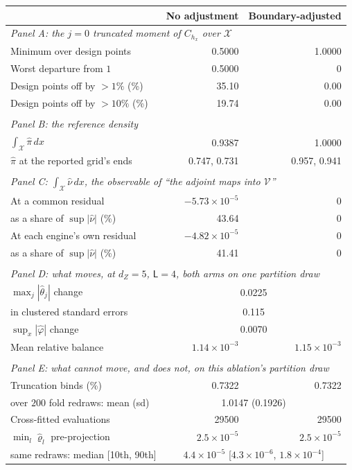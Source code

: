 \begin{tabular}{lrr}
\toprule
 & No adjustment & Boundary-adjusted \\
\midrule
\multicolumn{3}{l}{\textit{Panel A: the $j=0$ truncated moment of $C_{h_x}$ over $\mathcal X$}} \\
Minimum over design points & 0.5000 & 1.0000 \\
Worst departure from $1$ & 0.5000 & $0$ \\
Design points off by $>1\%$ (\%) & 35.10 & 0.00 \\
Design points off by $>10\%$ (\%) & 19.74 & 0.00 \\
\\[0.5em]
\multicolumn{3}{l}{\textit{Panel B: the reference density}} \\
$\int_{\mathcal X}\hat\pi\,dx$ & 0.9387 & 1.0000 \\
$\hat\pi$ at the reported grid's ends & 0.747, 0.731 & 0.957, 0.941 \\
\\[0.5em]
\multicolumn{3}{l}{\textit{Panel C: $\int_{\mathcal X}\hat\nu\,dx$, the observable of ``the adjoint maps into $\mathcal V$''}} \\
At a common residual & $-5.73 \times 10^{-5}$ & $0$ \\
\quad as a share of $\sup|\hat\nu|$ (\%) & 43.64 & $0$ \\
At each engine's own residual & $-4.82 \times 10^{-5}$ & $0$ \\
\quad as a share of $\sup|\hat\nu|$ (\%) & 41.41 & $0$ \\
\\[0.5em]
\multicolumn{3}{l}{\textit{Panel D: what moves, at $d_Z=5$, $\mathsf L=4$, both arms on one partition draw}} \\
$\max_j|\hat\theta_j|$ change & \multicolumn{2}{c}{0.0225} \\
\quad in clustered standard errors & \multicolumn{2}{c}{0.115} \\
$\sup_x|\hat\varphi|$ change & \multicolumn{2}{c}{0.0070} \\
Mean relative balance & $1.14 \times 10^{-3}$ & $1.15 \times 10^{-3}$ \\
\\[0.5em]
\multicolumn{3}{l}{\textit{Panel E: what cannot move, and does not, on this ablation's partition draw}} \\
Truncation binds (\%) & 0.7322 & 0.7322 \\
\quad over $200$ fold redraws: mean (sd) & \multicolumn{2}{c}{1.0147 (0.1926)} \\
Cross-fitted evaluations & 29500 & 29500 \\
$\min_l\hat\varrho_l$ pre-projection & $2.5 \times 10^{-5}$ & $2.5 \times 10^{-5}$ \\
\quad same redraws: median [10th, 90th] & \multicolumn{2}{c}{$4.4 \times 10^{-5}$ [$4.3 \times 10^{-6}$, $1.8 \times 10^{-4}$]} \\
\bottomrule
\end{tabular}
